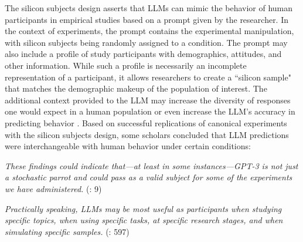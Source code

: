 \documentclass{article}
\begin{document}
The silicon subjects design asserts that LLMs can mimic the behavior of human participants in empirical studies based on a prompt given by the researcher. In the context of experiments, the prompt contains the experimental manipulation, with silicon subjects being randomly assigned to a condition. The prompt may also include a profile of study participants with demographics, attitudes, and other information. While such a profile is necessarily an incomplete representation of a participant, it allows researchers to create a ``silicon sample" \citep{argyle_out_2023} that matches the demographic makeup of the population of interest. The additional context provided to the LLM may increase the diversity of responses one would expect in a human population or even increase the LLM's accuracy in predicting behavior \citep{gui2023challenge}. 
Based on successful replications of canonical experiments with the silicon subjects design, some scholars concluded that LLM predictions were interchangeable with human behavior under certain conditions:
\begin{displayquote}
\textit{These findings could indicate that—at least in some instances—GPT-3 is not just a stochastic parrot and could pass as a valid subject for some of the experiments we have administered.} (\citealp{binz2024using}: 9)
\end{displayquote}
\begin{displayquote}
\textit{Practically speaking, LLMs may be most useful as participants when studying specific topics, when using specific tasks, at specific research stages, and when simulating specific samples.} (\citealp{dillion2023can}: 597)
\end{displayquote}
\end{document}
